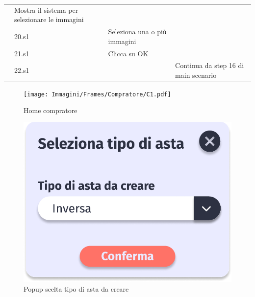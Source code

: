 \begin{longtable}{|C{3.0cm}|C{1.3cm}|L{5.2cm}|L{5.2cm}|}
                        & Mostra il sistema per selezionare le immagini\\
                        & 20.s1
                        & Seleziona una o più immagini
                        & \\
                        & 21.s1
                        & Clicca su OK
                        & \\
                        & 22.s1
                        & 
                        & Continua da step 16 di main scenario\\
                \hline
            \end{longtable}

            \begin{figure}[!htb]
            \begin{minipage}{0.32\textwidth}
                \centering
                \texttt{[image: Immagini/Frames/Compratore/C1.pdf]}
                \caption{Home compratore}
            \end{minipage}\hfill
            \begin{minipage}{0.32\textwidth}
                \centering
                \includegraphics[width=.7\linewidth]{Immagini/Frames/Popup/P0A.pdf}
                \caption{Popup scelta tipo di asta da creare}
            \end{minipage}\hfill
            \begin{minipage}{0.32\textwidth}
                \centering

\end{minipage}
\end{figure}

